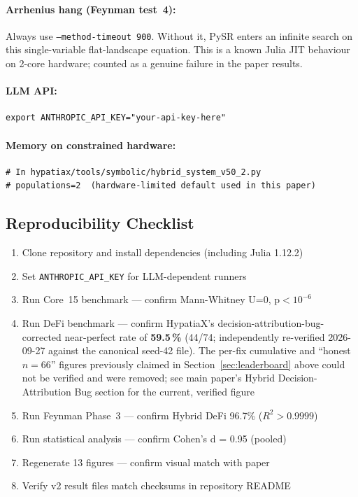 \documentclass[twoside,11pt]{article}
\begin{document}
\paragraph{Arrhenius hang (Feynman test~4):}
Always use \texttt{--method-timeout 900}. Without it, PySR enters an
infinite search on this single-variable flat-landscape equation.
This is a known Julia JIT behaviour on 2-core hardware; counted as a
genuine failure in the paper results.

\paragraph{LLM API:}
\begin{small}
\begin{verbatim}
export ANTHROPIC_API_KEY="your-api-key-here"
\end{verbatim}
\end{small}

\paragraph{Memory on constrained hardware:}
\begin{small}
\begin{verbatim}
# In hypatiax/tools/symbolic/hybrid_system_v50_2.py
# populations=2  (hardware-limited default used in this paper)
\end{verbatim}
\end{small}

\subsection{Reproducibility Checklist}

\begin{enumerate}
\item Clone repository and install dependencies (including Julia 1.12.2)
\item Set \texttt{ANTHROPIC\_API\_KEY} for LLM-dependent runners
\item Run Core~15 benchmark — confirm Mann-Whitney U=0, p$<10^{-6}$
\item Run DeFi benchmark --- confirm HypatiaX's decision-attribution-bug-corrected
  near-perfect rate of \textbf{59.5\,\%} (44/74; independently re-verified
  2026-09-27 against the canonical seed-42 file). The per-fix cumulative
  and ``honest $n{=}66$'' figures previously claimed in
  Section~\ref{sec:leaderboard} above could not be verified and were
  removed; see main paper's Hybrid Decision-Attribution Bug section for
  the current, verified figure
\item Run Feynman Phase~3 — confirm Hybrid DeFi 96.7\% ($R^2>0.9999$)
\item Run statistical analysis — confirm Cohen's d = 0.95 (pooled)
\item Regenerate 13 figures — confirm visual match with paper
\item Verify v2 result files match checksums in repository README
\end{enumerate}
\end{document}

